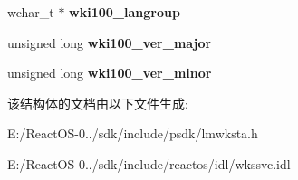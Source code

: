 \begin{DoxyCompactItemize}
wchar\+\_\+t $\ast$ {\bfseries wki100\+\_\+langroup}
\item 
\mbox{\label{struct___w_k_s_t_a___i_n_f_o__100_a16760b4caa475f5126a0dccc4a4b0fca}} 
unsigned long {\bfseries wki100\+\_\+ver\+\_\+major}
\item 
\mbox{\label{struct___w_k_s_t_a___i_n_f_o__100_a19f2ab3bb6cdff9bbb449cb0e97e01a2}} 
unsigned long {\bfseries wki100\+\_\+ver\+\_\+minor}
\end{DoxyCompactItemize}


该结构体的文档由以下文件生成\+:\begin{DoxyCompactItemize}
\item 
E\+:/\+React\+O\+S-\/0../sdk/include/psdk/lmwksta.\+h\item 
E\+:/\+React\+O\+S-\/0../sdk/include/reactos/idl/wkssvc.\+idl\end{DoxyCompactItemize}
